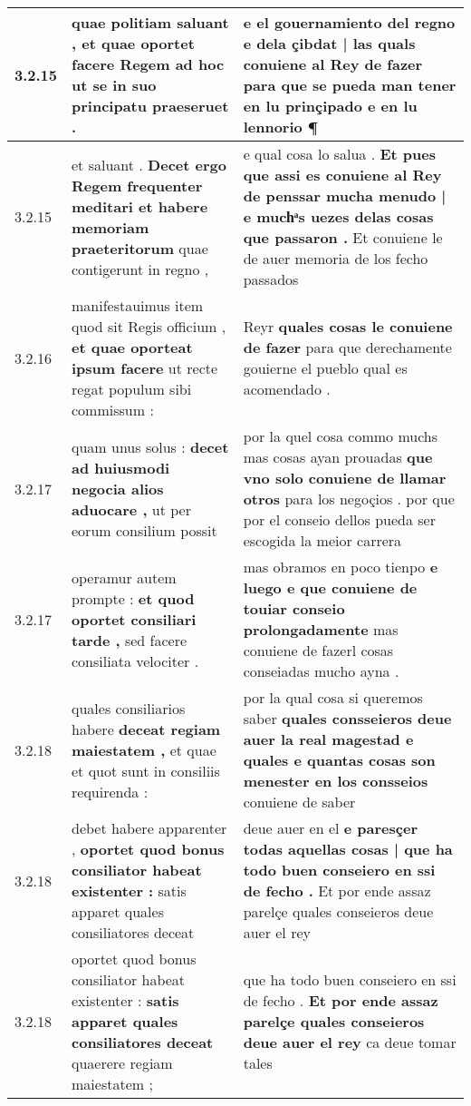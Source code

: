 \begin{tabular}{|p{1cm}|p{6.5cm}|p{6.5cm}|}
3.2.15 & quae politiam saluant , \textbf{ et quae oportet facere Regem ad hoc } ut se in suo principatu praeseruet . & e el gouernamiento del regno \textbf{ e dela çibdat | las quals conuiene al Rey de fazer } para que se pueda man tener en lu prinçipado e en lu lennorio ¶ \\\hline
3.2.15 & et saluant . \textbf{ Decet ergo Regem frequenter meditari et habere memoriam praeteritorum } quae contigerunt in regno , & e qual cosa lo salua . \textbf{ Et pues que assi es conuiene al Rey de penssar mucha menudo | e muchͣs uezes delas cosas que passaron . } Et conuiene le de auer memoria de los fecho passados \\\hline
3.2.16 & manifestauimus item quod sit Regis officium , \textbf{ et quae oporteat ipsum facere } ut recte regat populum sibi commissum : & Reyr \textbf{ quales cosas le conuiene de fazer } para que derechamente gouierne el pueblo qual es acomendado . \\\hline
3.2.17 & quam unus solus : \textbf{ decet ad huiusmodi negocia alios aduocare , } ut per eorum consilium possit & por la quel cosa commo muchs mas cosas ayan prouadas \textbf{ que vno solo conuiene de llamar otros } para los negoçios . por que por el conseio dellos pueda ser escogida la meior carrera \\\hline
3.2.17 & operamur autem prompte : \textbf{ et quod oportet consiliari tarde , } sed facere consiliata velociter . & mas obramos en poco tienpo \textbf{ e luego e que conuiene de touiar conseio prolongadamente } mas conuiene de fazerl cosas conseiadas mucho ayna . \\\hline
3.2.18 & quales consiliarios habere \textbf{ deceat regiam maiestatem , } et quae et quot sunt in consiliis requirenda : & por la qual cosa si queremos saber \textbf{ quales consseieros deue auer la real magestad e quales e quantas cosas son menester en los consseios } conuiene de saber \\\hline
3.2.18 & debet habere apparenter , \textbf{ oportet quod bonus consiliator habeat existenter : } satis apparet quales consiliatores deceat & deue auer en el \textbf{ e paresçer todas aquellas cosas | que ha todo buen conseiero en ssi de fecho . } Et por ende assaz parelçe quales conseieros deue auer el rey \\\hline
3.2.18 & oportet quod bonus consiliator habeat existenter : \textbf{ satis apparet quales consiliatores deceat } quaerere regiam maiestatem ; & que ha todo buen conseiero en ssi de fecho . \textbf{ Et por ende assaz parelçe quales conseieros deue auer el rey } ca deue tomar tales \\\hline

\end{tabular}
